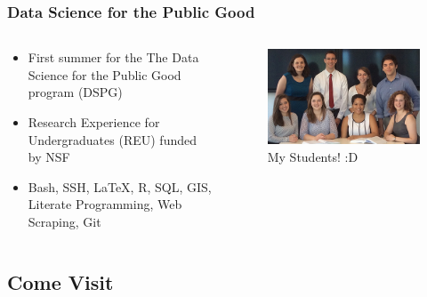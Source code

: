\documentclass[compress]{beamer}
\begin{document}
    \begin{frame}[Basic2] \frametitle{Data Science for the Public Good}

        \begin{columns}
            \begin{column}{0.5\textwidth}
                \begin{itemize}
                    \item First summer for the The Data Science for the Public Good program (DSPG)
                    \item Research Experience for Undergraduates (REU) funded by NSF
                    \item Bash, SSH, \LaTeX, R, SQL, GIS, Literate Programming, Web Scraping, Git
                \end{itemize}
            \end{column}
            \begin{column}{0.5\textwidth}
                \begin{figure}
                    \centering
                    \includegraphics[width=0.9\linewidth]{../figures/data-science-for-public-good-student-photo-overview}
                    \caption{My Students! :D}
                    \label{fig:data-science-for-public-good-student-photo-overview}
                \end{figure}
            \end{column}
        \end{columns}
    \end{frame}

\subsection[Come Visit]{Come Visit}
\end{document}
